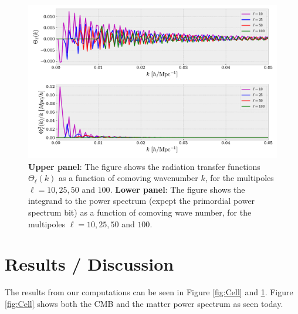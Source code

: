 \documentclass[twocolumn]{aastex62}
\begin{document}
\begin{figure}
    \includegraphics[scale = 0.65]{Figures/Transfer_func.pdf}
    \caption{\textbf{Upper panel}: The figure shows the radiation transfer functions $\Theta_\ell(k)$ as a function of comoving wavenumber $k$, for the multipoles $\ell = 10, 25, 50$ and $100$. \textbf{Lower panel}: The figure shows the integrand to the power spectrum (expept the primordial power spectrum bit) as a function of comoving wave number, for the multipoles $\ell = 10, 25, 50$ and $100$.}
    \label{fig:Transfer_func}
\end{figure}

\section{Results / Discussion}\label{sec:Results/Discussion}
The results from our computations can be seen in Figure \ref{fig:Cell} and \ref{fig:Transfer_func}. Figure \ref{fig:Cell} shows both the CMB and the matter power spectrum as seen today. 
\end{document}
